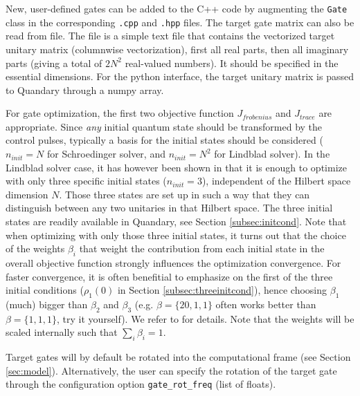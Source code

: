 \documentclass[11pt]{article}
\begin{document}
New, user-defined gates can be added to the C++ code by augmenting the \texttt{Gate} class in the corresponding \texttt{.cpp} and \texttt{.hpp} files.
The target gate matrix can also be read from file. The file is a simple text file that contains the vectorized target unitary matrix (columnwise vectorization), first all real parts, then all imaginary parts (giving a total of $2N^2$ real-valued numbers). It should be specified in the essential dimensions. 
For the python interface, the target unitary matrix is passed to Quandary through a numpy array.

For gate optimization, the first two objective function $J_{frobenius}$ and $J_{trace}$ are appropriate. Since \textit{any} initial quantum state should be transformed by the control pulses, typically a basis for the initial states should be considered ($n_{init} = N$ for Schroedinger solver, and $n_{init}=N^2$ for Lindblad solver). In the Lindblad solver case, it has however been shown in \cite{goerz2014optimal} that it is enough to optimize with only three specific initial states ($n_{init} = 3$), independent of the Hilbert space dimension $N$. Those three states are set up in such a way that they can distinguish between any two unitaries in that Hilbert space. The three initial states are readily available in Quandary, see Section \ref{subsec:initcond}. Note that when optimizing with only those three initial states, it turns out that the choice of the weights $\beta_i$ that weight the contribution from each initial state in the overall objective function strongly influences the optimization convergence. For faster convergence, it is often benefitial to emphasize on the first of the three initial conditions ($\rho_1(0)$ in Section \ref{subsec:threeinitcond}), hence choosing $\beta_1$ (much) bigger than $\beta_2$ and $\beta_3$ (e.g. $\beta = \{20,1,1\}$ often works better than $\beta = \{1,1,1\}$, try it yourself). We refer to \cite{goerz2014optimal} for details. Note that the weights will be scaled internally such that $\sum_i \beta_i = 1$.

Target gates will by default be rotated into the computational frame (see Section \ref{sec:model}). Alternatively, the user can specify the rotation of the target gate through the configuration option \texttt{gate\_rot\_freq} (list of floats). 
\end{document}
